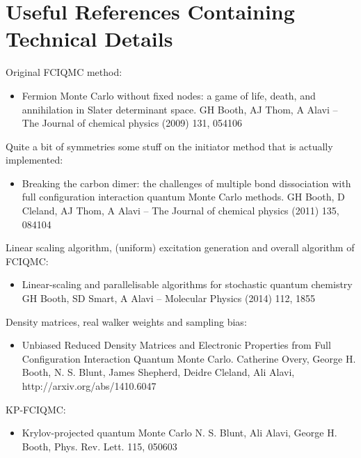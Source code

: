 \documentclass[a4paper,notitlepage]{scrreprt}
\begin{document}
\section{Useful References Containing Technical Details}

Original FCIQMC method:
\begin{itemize}
\item Fermion Monte Carlo without fixed nodes: a game of life, death, and annihilation in Slater determinant space. \newline
GH Booth, AJ Thom, A Alavi – The Journal of chemical physics (2009) 131, 054106
\end{itemize}

Quite a bit of symmetries some stuff on the initiator method that is actually implemented:
\begin{itemize}
\item Breaking the carbon dimer: the challenges of multiple bond dissociation with full configuration interaction quantum Monte Carlo methods.
GH Booth, D Cleland, AJ Thom, A Alavi – The Journal of chemical physics (2011) 135, 084104
\end{itemize}

Linear scaling algorithm, (uniform) excitation generation and overall algorithm of FCIQMC:
\begin{itemize}
\item Linear-scaling and parallelisable algorithms for stochastic quantum chemistry
GH Booth, SD Smart, A Alavi – Molecular Physics (2014) 112, 1855
\end{itemize}

Density matrices, real walker weights and sampling bias:
\begin{itemize}
\item Unbiased Reduced Density Matrices and Electronic Properties from Full Configuration Interaction Quantum Monte Carlo.
Catherine Overy, George H. Booth, N. S. Blunt, James Shepherd, Deidre Cleland, Ali Alavi, http://arxiv.org/abs/1410.6047
\end{itemize}

KP-FCIQMC:
\begin{itemize}
\item Krylov-projected quantum Monte Carlo
N. S. Blunt, Ali Alavi, George H. Booth, Phys. Rev. Lett. 115, 050603
\end{itemize}
\end{document}
